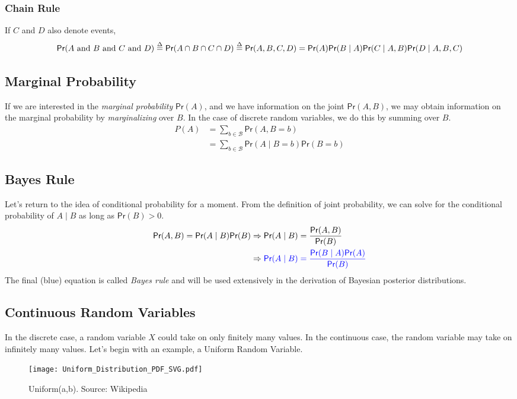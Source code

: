 \documentclass[twoside]{article}
\def\defn{\stackrel{\Delta}{=}} %
\def\Pr{\textsf{Pr}} %
\def\tn#1{\textnormal{#1}} %
\begin{document}
\subsubsection*{Chain Rule}
If $C$ and $D$ also denote events,
\[\Pr(A \tn{ and } B \tn{ and } C \tn{ and } D) \defn \Pr( A \cap B \cap C \cap D) \defn \Pr( A, B, C, D) = \Pr(A)\Pr(B\mid A)\Pr(C\mid A,B)\Pr(D \mid A,B,C)
\]

\subsection*{Marginal Probability}
If we are interested in the \emph{marginal probability} $\Pr(A)$, and we have information on the joint $\Pr(A,B)$, we may obtain information on the marginal probability by \emph{marginalizing} over $B$. In the case of discrete random variables, we do this by summing over $B$. 
\begin{align*}
 P(A) & = \sum_{b \in \mathcal{B} } \Pr(A, B=b)\\
 & = \sum_{ b \in \mathcal{B} } \Pr(A\mid B=b)\Pr(B=b)
\end{align*}

\subsection*{Bayes Rule} 
Let's return to the idea of conditional probability for a moment. From the definition of joint probability, we can solve for the conditional probability of $A\mid B$ as long as $\Pr(B)>0$. 
\begin{align*} 
\Pr( A, B) = \Pr(A\mid B)\Pr(B) & \Rightarrow \Pr(A\mid B) = \frac{\Pr( A, B)}{\Pr(B)}\\
 & \Rightarrow  {\color{blue} \Pr(A\mid B) = \frac{\Pr(B\mid A)\Pr(A)}{\Pr(B)} }
\end{align*}
The final (blue) equation is called \emph{Bayes rule} and will be used extensively in the derivation of Bayesian posterior distributions.

\subsection*{Continuous Random Variables}
In the discrete case, a random variable $X$ could take on only finitely many values. In the continuous case, the random variable may take on infinitely many values. Let's begin with an example, a Uniform Random Variable.
\begin{figure}[!htbp]
 \texttt{[image: Uniform\_Distribution\_PDF\_SVG.pdf]}
 \caption{Uniform(a,b). Source: Wikipedia}
 \label{fig:uniform}
\end{figure}
\end{document}
